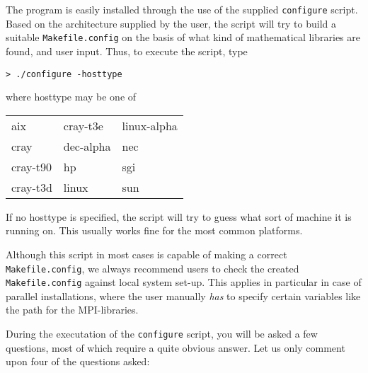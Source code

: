 The program is easily installed through the use of the supplied
\verb|configure| script. Based on the
architecture supplied by the user, the
script will try to build a suitable
\verb|Makefile.config| on the
basis of what kind of mathematical libraries are found, and user
input. Thus, to execute the script, type

\begin{verbatim}
> ./configure -hosttype
\end{verbatim}
where hosttype may be one of

\bigskip

\begin{tabular}{lll}
aix \hspace{3cm} & cray-t3e \hspace{3cm} & linux-alpha\\
cray             & dec-alpha             & nec\\
cray-t90         & hp                    & sgi\\
cray-t3d         & linux                 & sun\\
\end{tabular}

\bigskip

If no hosttype is specified, the script will try to guess what sort of
machine it is running on. This usually works fine for the most common
platforms.

Although this script in most cases is capable of making a correct
\verb|Makefile.config|, we always recommend users to check the created
\verb|Makefile.config| against local system set-up. This applies in
particular in case of parallel installations, where the user manually
{\em has} to specify certain variables like the path for the
MPI-libraries.

During the executation of the \verb|configure| script, you will be
asked a few questions, most of which require a quite obvious
answer. Let us only comment upon four of the questions asked:

